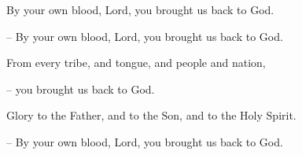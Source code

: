 By your own blood, Lord, you brought us back to God.\par
– By your own blood, Lord, you brought us back to God.\par
\par
From every tribe, and tongue, and people and nation,\par
– you brought us back to God.\par
\par
Glory to the Father, and to the Son, and to the Holy Spirit.\par
– By your own blood, Lord, you brought us back to God.\par
